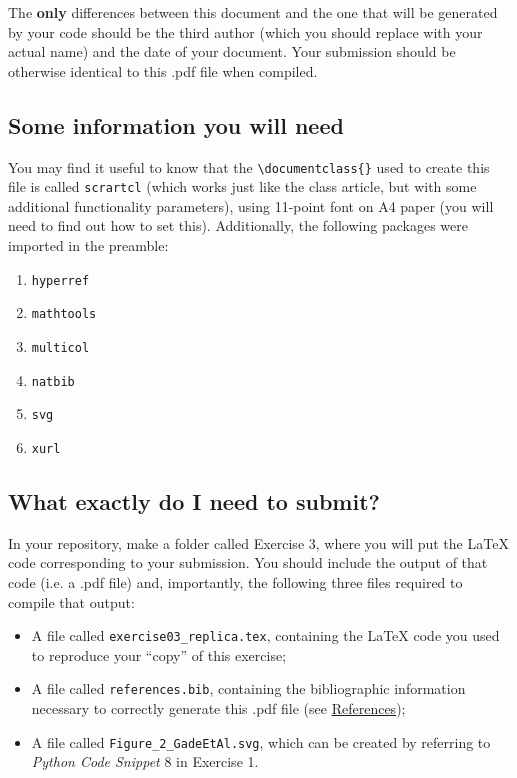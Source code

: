 \documentclass[11pt,a4paper]{scrartcl}
\begin{document}
The \textbf{only} differences between this document and the one that will be generated by
your code should be the third author (which you should replace with your actual name)
and the date of your document. Your submission should be otherwise identical to this
.pdf file when compiled.

\newpage
\subsection{Some information you will need}
You may find it useful to know that the \verb|\documentclass{}| used to create this file is
called \texttt{scrartcl} (which works just like the class article, but with some additional
functionality parameters), using 11-point font on A4 paper (you will need to find out
how to set this). Additionally, the following packages were imported in the preamble:

\begin{multicols}{2}
\begin{enumerate}[label=\roman*.]
    \item \texttt{hyperref}
    \item \texttt{mathtools}
    \item \texttt{multicol}
    \item \texttt{natbib}
    \item \texttt{svg}
    \item \texttt{xurl}
\end{enumerate}
\end{multicols}

\subsection{What exactly do I need to submit?}
\label{2.2}
In your repository, make a folder called Exercise 3, where you will put the LaTeX code
corresponding to your submission. You should include the output of that code (i.e. a
.pdf file) and, importantly, the following three files required to compile that output:

\begin{itemize}
    \item A file called \texttt{exercise03\_replica.tex}, containing the LaTeX code you used to
reproduce your “copy” of this exercise;
    \item A file called \texttt{references.bib}, containing the bibliographic information necessary
to correctly generate this .pdf file (see \hyperref[References]{References});
    \item  A file called \texttt{Figure\_2\_GadeEtAl.svg}, which can be created by referring to \textit{Python
Code Snippet} 8 in Exercise 1.
\end{itemize}
\end{document}

